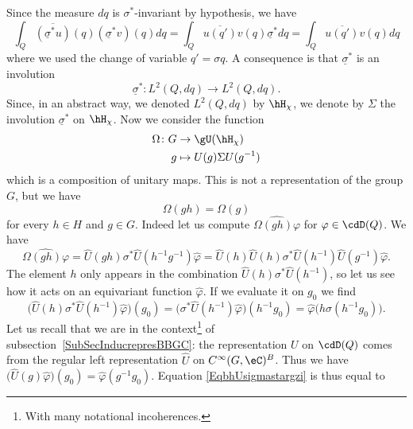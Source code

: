 Since the measure $dq$ is $\sigma^*$-invariant by hypothesis, we have
\begin{equation}
	\int_Q\overline{ (\underline\sigma^*u) }(q)(\underline\sigma^*v)(q)dq=\int_Q\overline{ u(q') }v(q)\underline\sigma^*dq=\int_Q\overline{ u(q') }v(q)dq
\end{equation}
where we used the change of variable $q'=\sigma q$. A consequence is that $\underline\sigma^*$ is an involution
\begin{equation}
	\underline\sigma^*\colon L^2(Q,dq)\to L^2(Q,dq).
\end{equation}
Since, in an abstract way, we denoted $L^2(Q,dq)$ by $\hH_{\chi}$, we denote by $\Sigma$ the involution $\underline\sigma^*$ on $\hH_{\chi}$. Now we consider the function
\begin{equation}
	\begin{aligned}
		\Omega\colon G & \to \gU(\hH_{\chi})          \\
		g              & \mapsto U(g)\Sigma U(g^{-1})
	\end{aligned}
\end{equation}
which is a composition of unitary maps. This is not a representation of the group $G$, but we have
\begin{equation}
	\Omega(gh)=\Omega(g)
\end{equation}
for every $h\in H$ and $g\in G$. Indeed let us compute $\widehat{\Omega(gh)\varphi}$ for $\varphi\in\cdD(Q)$. We have
\begin{equation}		\label{EqwOshvhvkl}
	\widehat{\Omega(gh)\varphi}=\hat U(gh)\sigma^*\hat U(h^{-1}g^{-1})\hat\varphi
	=\hat U(h)\hat U(h)\sigma^*\hat U(h^{-1})\hat U(g^{-1})\hat\varphi.
\end{equation}
The element $h$ only appears in the combination $\hat U(h)\sigma^*\hat U(h^{-1})$, so let us see how it acts on an equivariant function $\hat \varphi$. If we evaluate it on $g_0$ we find
\begin{equation}		\label{EqbhUsigmastargzi}
	\big( \hat U(h)\sigma^*\hat U(h^{-1})\hat\varphi \big)(g_0)=\big( \sigma^*\hat U(h^{-1})\hat\varphi \big)(h^{-1}g_0)
	=\hat\varphi\big( h\sigma(h^{-1}g_0) \big).
\end{equation}
Let us recall that we are in the context\footnote{With many notational incoherences.} of subsection~\ref{SubSecInducrepresBBGC}: the representation $U$ on $\cdD(Q)$ comes from the regular left representation $\hat U$ on $ C^{\infty}(G,\eC)^B$. Thus we have $\big( \hat U(g)\hat\varphi \big)(g_0)=\hat\varphi(g^{-1}g_0)$. Equation \eqref{EqbhUsigmastargzi} is thus equal to
